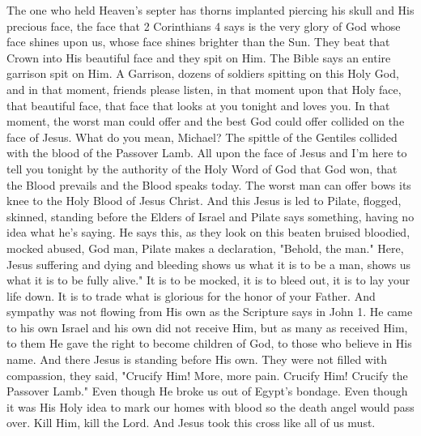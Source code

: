 \documentclass[11pt]{article}
\begin{document}
\begin{description}
The one who held Heaven's septer has thorns
implanted piercing his skull and His
precious face, the face that 2
Corinthians 4 says is the very glory of
God whose face shines upon
us, whose face shines brighter than the
Sun. They beat that Crown into His beautiful
face and they spit on Him. The Bible says
an entire garrison spit on Him. A Garrison, dozens
of soldiers spitting on this Holy
God, and in that moment, friends please
listen, in that moment upon that Holy
face, that beautiful
face, that face that looks at you tonight
and loves you. In that
moment, the worst man could
offer and the best God could offer
collided on the face of
Jesus. What do you mean, Michael? The
spittle of the Gentiles collided with the blood of the
Passover Lamb. All upon the face of
Jesus and I'm here to tell you
tonight by the authority of the Holy
Word of God that God won, that the Blood
prevails and the Blood speaks
today. The worst man can offer bows its
knee to the Holy Blood of Jesus
Christ. And this Jesus is led to Pilate, flogged, skinned,
standing before the Elders of
Israel and Pilate says
something, having no idea what he's
saying. He says this, as they look
on this beaten bruised
bloodied, mocked abused, God man,
Pilate makes a declaration, "Behold, the
man." Here, Jesus suffering and dying and
bleeding shows us what it is to be a
man, shows us what it is to be fully
alive." It is to be mocked, it is to bleed
out, it is to lay your life down. It is to
trade what is glorious for the honor of your
Father. And sympathy was not flowing from
His own as the Scripture says in John 1.
He came to his own Israel and his own
did not receive Him, but as many as received
Him, to them He gave the right to become
children of God, to those who believe in
His name. And there Jesus is standing
before His own. They were not filled with compassion,
they said, "Crucify Him! More, more pain.
Crucify Him! Crucify the Passover Lamb."
Even though He broke us out of Egypt's
bondage. Even though it was His Holy idea
to mark our homes with blood so the
death angel would pass over. Kill Him,
kill the Lord.  And Jesus took this
cross like all of us
must.


\end{description}
\end{document}
